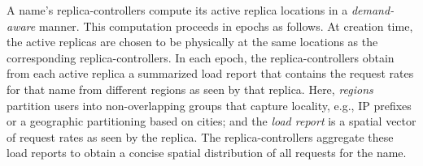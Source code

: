 



%

A name's replica-controllers compute its active replica locations in a {\em demand-aware} manner. This computation proceeds in epochs as follows. At creation time, the active replicas are chosen to be physically at the same locations as the corresponding replica-controllers. In each epoch, the replica-controllers obtain from each active replica a summarized load report that contains the request rates for that name from different {regions} as seen by that replica. Here, {\em regions} partition users into non-overlapping groups that capture locality, e.g., IP prefixes or a geographic  partitioning based on cities; and the {\em load report} is a spatial vector of request rates as seen by the replica. The replica-controllers aggregate these load reports to obtain a concise spatial distribution of all requests for the name.




\vsp
